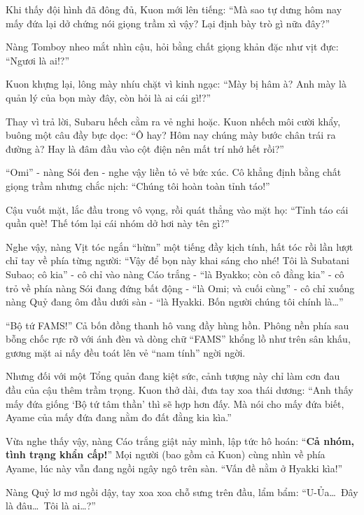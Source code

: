 \documentclass[../main.tex]{subfiles}
\begin{document}
Khi thấy đội hình đã đông đủ, Kuon mới lên tiếng: ``Mà sao tự dưng hôm nay mấy đứa lại dở chứng nói giọng trầm xì vậy? Lại định bày trò gì nữa đây?''

Nàng Tomboy nheo mắt nhìn cậu, hỏi bằng chất giọng khản đặc như vịt đực: ``Ngươi là ai!?''

Kuon khựng lại, lông mày nhíu chặt vì kinh ngạc: ``Mày bị hâm à? Anh mày là quản lý của bọn mày đây, còn hỏi là ai cái gì!?''

Thay vì trả lời, Subaru hếch cằm ra vẻ nghi hoặc. Kuon nhếch môi cười khẩy, buông một câu đầy bực dọc: ``Ô hay? Hôm nay chúng mày bước chân trái ra đường à? Hay là đâm đầu vào cột điện nên mất trí nhớ hết rồi?''

``Omi'' - nàng Sói đen - nghe vậy liền tỏ vẻ bức xúc. Cô khẳng định bằng chất giọng trầm nhưng chắc nịch: ``Chúng tôi hoàn toàn tỉnh táo!''

Cậu vuốt mặt, lắc đầu trong vô vọng, rồi quát thẳng vào mặt họ: ``Tỉnh táo cái quần què! Thế tóm lại cái nhóm dở hơi này tên gì?''

Nghe vậy, nàng Vịt tóc ngắn ``hừm'' một tiếng đầy kịch tính, hất tóc rồi lần lượt chỉ tay về phía từng người: ``Vậy để bọn này khai sáng cho nhé! Tôi là Subatani Subao; cô kia'' - cô chỉ vào nàng Cáo trắng - ``là Byakko; còn cô đằng kia'' - cô trỏ về phía nàng Sói đang đứng bất động - ``là Omi; và cuối cùng'' - cô chỉ xuống nàng Quỷ đang ôm đầu dưới sàn - ``là Hyakki. Bốn người chúng tôi chính là\dots''


``Bộ tứ FAMS!'' Cả bốn đồng thanh hô vang đầy hùng hồn. Phông nền phía sau bỗng chốc rực rỡ với ánh đèn và dòng chữ ``FAMS'' khổng lồ như trên sân khấu, gương mặt ai nấy đều toát lên vẻ ``nam tính'' ngời ngời.

Nhưng đối với một Tổng quản đang kiệt sức, cảnh tượng này chỉ làm cơn đau đầu của cậu thêm trầm trọng. Kuon thở dài, đưa tay xoa thái dương: ``Anh thấy mấy đứa giống `Bộ tứ tâm thần' thì sẽ hợp hơn đấy. Mà nói cho mấy đứa biết, Ayame của mấy đứa đang nằm đo đất đằng kia kìa.''

Vừa nghe thấy vậy, nàng Cáo trắng giật nảy mình, lập tức hô hoán: ``\textbf{Cả nhóm, tình trạng khẩn cấp!}'' Mọi người (bao gồm cả Kuon) cùng nhìn về phía Ayame, lúc này vẫn đang ngồi ngây ngô trên sàn. ``Vấn đề nằm ở Hyakki kìa!''


Nàng Quỷ lơ mơ ngồi dậy, tay xoa xoa chỗ sưng trên đầu, lẩm bẩm: ``U-Ủa\dots\ Đây là đâu\dots\ Tôi là ai\dots?''
\end{document}
